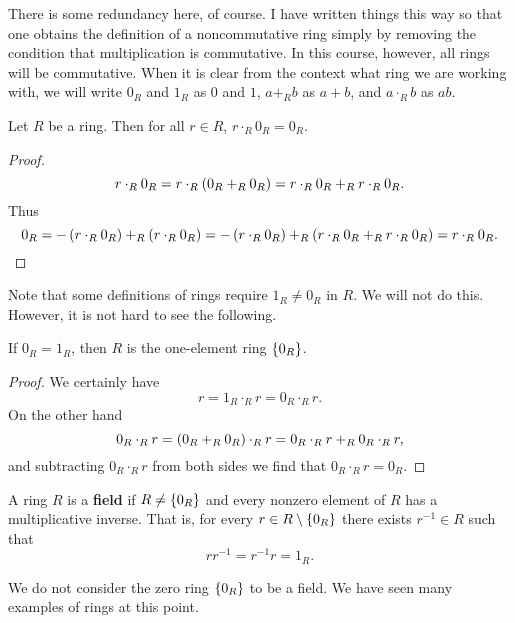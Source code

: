 There is some redundancy here, of course. I have written things this way so that one obtains the definition of a noncommutative ring simply by removing the condition that multiplication is commutative. In this course, however, all rings will be commutative. When it is clear from the context what ring we are working with, we will write $ 0_R $ and $ 1_R $ as $ 0 $ and $ 1 $, $ a +_R b $ as $ a + b $, and $ a \cdot_R b $ as $ ab $.

\begin{proposition}
Let $ R $ be a ring. Then for all $ r \in R $, $ r \cdot_R 0_R = 0_R $.
\end{proposition}

\begin{proof}
$$ r \cdot_R 0_R = r \cdot_R \left( 0_R +_R 0_R \right) = r \cdot_R 0_R +_R r \cdot_R 0_R. $$
Thus
$$ 0_R = -\left( r \cdot_R 0_R \right) +_R \left( r \cdot_R 0_R \right) = -\left( r \cdot_R 0_R \right) +_R \left( r \cdot_R 0_R +_R r \cdot_R 0_R \right) = r \cdot_R 0_R. $$
\end{proof}

Note that some definitions of rings require $ 1_R \ne 0_R $ in $ R $. We will not do this. However, it is not hard to see the following.

\begin{proposition}
If $ 0_R = 1_R $, then $ R $ is the one-element ring $ \left\{ 0_R \right\} $.
\end{proposition}

\begin{proof}
We certainly have
$$ r = 1_R \cdot_R r = 0_R \cdot_R r. $$
On the other hand
$$ 0_R \cdot_R r = \left( 0_R +_R 0_R \right) \cdot_R r = 0_R \cdot_R r +_R 0_R \cdot_R r, $$
and subtracting $ 0_R \cdot_R r $ from both sides we find that $ 0_R \cdot_R r = 0_R $.
\end{proof}

\begin{definition}
A ring $ R $ is a \textbf{field} if $ R \ne \left\{ 0_R \right\} $ and every nonzero element of $ R $ has a multiplicative inverse. That is, for every $ r \in R \setminus \left\{ 0_R \right\} $ there exists $ r^{-1} \in R $ such that
$$ rr^{-1} = r^{-1}r = 1_R. $$
\end{definition}

We do not consider the zero ring $ \left\{ 0_R \right\} $ to be a field. We have seen many examples of rings at this point.

